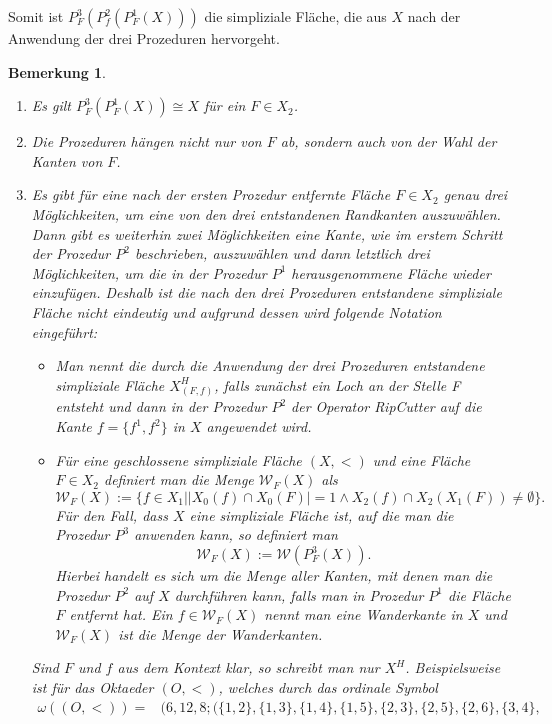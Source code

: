 \documentclass[12pt,titlepage,twoside,cleardoublepage]{article}
\theoremstyle{nummermitklammern}
\newtheorem{bemerkung}[temp]{Bemerkung}
\newtheorem{bemerkung}[zahl]{Bemerkung}
\numberwithin{equation}{section}
\begin{document}
Somit ist $P^3_F(P^2_f(P^1_F(X)))$ die simpliziale Fläche, die aus $X$ nach der Anwendung der drei Prozeduren hervorgeht.
\begin{bemerkung}
\begin{enumerate}
\item Es gilt $P^3_F(P^1_F(X))\cong X$ für ein $F \in X_2 $.
\item Die Prozeduren hängen nicht nur von $F$ ab, sondern auch von der Wahl der Kanten von $F$.
\item Es gibt für eine nach der ersten Prozedur entfernte Fläche $F \in X_{2}$ genau  drei Möglichkeiten, um eine von den drei entstandenen Randkanten auszuwählen.
 Dann gibt es weiterhin zwei Möglichkeiten eine Kante, wie im erstem Schritt der Prozedur $P^2$ beschrieben, auszuwählen und dann letztlich drei Möglichkeiten, um die in der Prozedur $P^1$ herausgenommene Fläche wieder einzufügen.
  Deshalb ist die nach den drei Prozeduren entstandene simpliziale Fläche nicht eindeutig und aufgrund dessen wird folgende Notation eingeführt: 
\begin{itemize}
\item Man nennt die durch die Anwendung der drei Prozeduren entstandene simpliziale Fläche $X^{H}_{(F,f)}$, falls zunächst ein \emph{Loch an der Stelle F} entsteht und dann in der Prozedur $P^2$ der Operator \emph{RipCutter} auf die Kante $f=\{f^1,f^2\}$ in $X$ angewendet wird. 
\item Für eine geschlossene simpliziale Fläche $(X,<)$ und eine Fläche $F \in X_2$ definiert man die Menge \emph{$\mathcal{W}_F(X)$} als 
\[
\mathcal{W}_F(X):=\{f \in X_1\mid \vert X_{0}(f) \cap X_{0}(F)\vert = 1 \land X_2(f) \cap X_2(X_1(F))\neq \emptyset\} .
\] 
Für den Fall, dass $X$ eine simpliziale Fläche ist, auf die man die Prozedur $P^3$ anwenden kann, so definiert man
\[
\mathcal{W}_F(X):=\mathcal{W}(P^3_F(X)).
\]
Hierbei handelt es sich um die Menge aller Kanten, mit denen man die Prozedur $P^2$ auf $X$
durchführen kann, falls man in Prozedur $P^1$ die Fläche $F$ entfernt hat. Ein $f\in \mathcal{W}_F(X)$ nennt man eine \emph{Wanderkante} in $X$ und $\mathcal{W}_F(X)$ ist die \emph{Menge der Wanderkanten}.
 \end{itemize}
 Sind $F$ und $f$ aus dem Kontext klar, so schreibt man nur $X^H$.
Beispielsweise ist für das Oktaeder $(O,<)$, welches durch das ordinale Symbol  
\begin{align*}
\omega((O,<))=&(6,12,8;(\{ 1, 2 \}, \{ 1, 3 \}, \{ 1, 4 \}, \{ 1, 5 \}, \{ 2, 3 \}, \{ 2, 5 \}, \{ 2, 6 \},\{ 3, 4 \},\\ 

\end{align*}
\end{enumerate}
\end{bemerkung}
\end{document}
